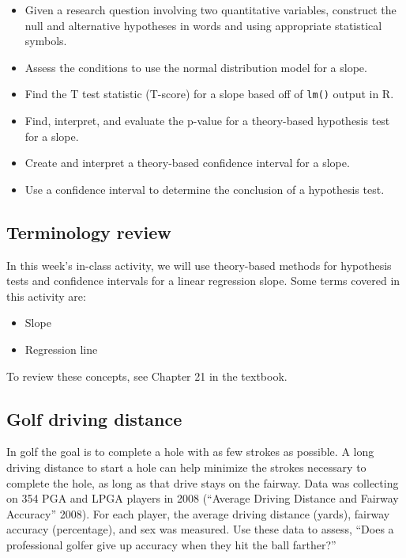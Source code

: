 \documentclass[
]{report}
\begin{document}
\begin{itemize}
\item
  Given a research question involving two quantitative variables, construct the null and alternative hypotheses
  in words and using appropriate statistical symbols.
\item
  Assess the conditions to use the normal distribution model for a slope.
\item
  Find the T test statistic (T-score) for a slope based off of \texttt{lm()} output in R.
\item
  Find, interpret, and evaluate the p-value for a theory-based hypothesis test for a slope.
\item
  Create and interpret a theory-based confidence interval for a slope.
\item
  Use a confidence interval to determine the conclusion of a hypothesis test.
\end{itemize}

\hypertarget{terminology-review-22}{%
\subsection{Terminology review}\label{terminology-review-22}}

In this week's in-class activity, we will use theory-based methods for hypothesis tests and confidence intervals for a linear regression slope. Some terms covered in this activity are:

\begin{itemize}
\item
  Slope
\item
  Regression line
\end{itemize}

To review these concepts, see Chapter 21 in the textbook.

\hypertarget{golf-driving-distance}{%
\subsection{Golf driving distance}\label{golf-driving-distance}}

In golf the goal is to complete a hole with as few strokes as possible. A long driving distance to start a hole can help minimize the strokes necessary to complete the hole, as long as that drive stays on the fairway. Data was collecting on 354 PGA and LPGA players in 2008 ({``Average Driving Distance and Fairway Accuracy''} 2008). For each player, the average driving distance (yards), fairway accuracy (percentage), and sex was measured. Use these data to assess, ``Does a professional golfer give up accuracy when they hit the ball farther?''
\end{document}
